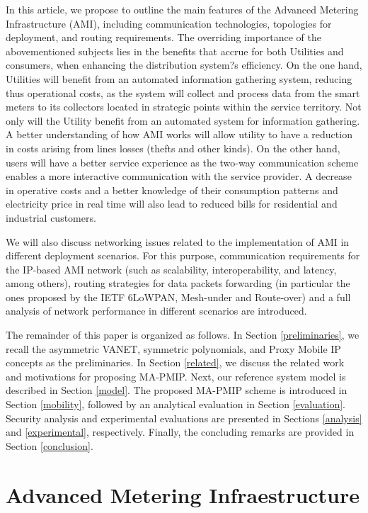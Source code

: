 \documentclass[11pt,final,onecolumn]{IEEEtran}
\begin{document}
In this article, we propose to outline the main features of the Advanced Metering Infrastructure (AMI), including communication technologies, topologies for deployment, and routing requirements. The overriding importance of the abovementioned subjects lies in the benefits that accrue for both Utilities and consumers, when enhancing the distribution system?s efficiency. On the one hand, Utilities will benefit from an automated information gathering system, reducing thus operational costs, as the system will collect and process data from the smart meters to its collectors located in strategic points within the service territory. Not only will the Utility benefit from an automated system for information gathering. A better understanding of how AMI works will allow utility to have a reduction in costs arising from lines losses (thefts and other kinds). On the other hand, users will have a better service experience as the two-way communication scheme enables a more interactive communication with the service provider. A decrease in operative costs and a better knowledge of their consumption patterns and electricity price in real time will also lead to reduced bills for residential and industrial customers. 

We will also discuss networking issues related to the implementation of AMI in different deployment scenarios. For this purpose, communication requirements for the IP-based AMI network (such as scalability, interoperability, and latency, among others), routing strategies for data packets forwarding (in particular the ones proposed by the IETF 6LoWPAN, Mesh-under and Route-over) and a full analysis of network performance in different scenarios are introduced. 


The remainder of this paper is organized as follows. In Section \ref{preliminaries}, we recall the asymmetric VANET, symmetric polynomials, and Proxy Mobile IP concepts as the preliminaries. In Section  \ref{related}, we discuss the related work and motivations for proposing MA-PMIP. Next, our reference system model is described in Section \ref{model}. The proposed MA-PMIP scheme is introduced in Section \ref{mobility}, followed by an analytical evaluation in Section \ref{evaluation}. Security analysis and experimental evaluations are presented in Sections \ref{analysis} and \ref{experimental}, respectively. Finally, the concluding remarks are provided in Section \ref{conclusion}.

\section{Advanced Metering Infraestructure}\label{ami}
\end{document}
